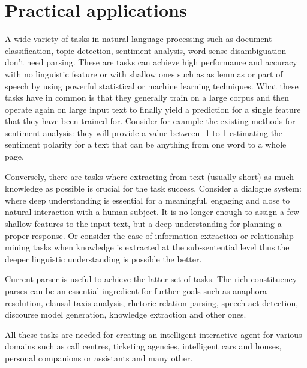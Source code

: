 
\section{Practical applications}
A wide variety of tasks in natural language processing such as document classification, topic detection, sentiment analysis, word sense disambiguation don't need parsing. These are tasks can achieve high performance and accuracy with no linguistic feature or with shallow ones such as as lemmas or part of speech by using powerful statistical or machine learning techniques. What these tasks have in common is that they generally train on a large corpus and then operate again on large input text to finally yield a prediction for a single feature that they have been trained for. Consider for example the existing methods for sentiment analysis: they will provide a value between -1 to 1 estimating the sentiment polarity for a text that can be anything from one word to a whole page. 
 
Conversely, there are tasks where extracting from text (usually short) as much knowledge as possible is crucial for the task success. Consider a dialogue system: where deep understanding is essential for a meaningful, engaging and close to natural interaction with a human subject. It is no longer enough to assign a few shallow features to the input text, but a deep understanding for planning a proper response. Or consider the case of information extraction or relationship mining tasks when knowledge is extracted at the sub-sentential level thus the deeper linguistic understanding is possible the better. 

Current parser is useful to achieve the latter set of tasks. The rich constituency parses can be an essential ingredient for further goals such as anaphora resolution, clausal taxis analysis, rhetoric relation parsing, speech act detection, discourse model generation, knowledge extraction and other ones.   

All these tasks are needed for creating an intelligent interactive agent for various domains such as call centres, ticketing agencies, intelligent cars and houses, personal companions or assistants and many other. 


